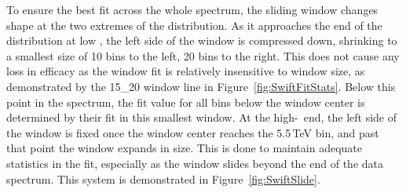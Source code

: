 To ensure the best fit across the whole spectrum, the sliding window changes shape at the two extremes of the distribution.  As it approaches the end of the distribution at low \mjj, the left side of the window is compressed down, shrinking to a smallest size of 10 bins to the left, 20 bins to the right.  This does not cause any loss in efficacy as the window fit is relatively insensitive to window size, as demonstrated by the 15\_20 window line in Figure~\ref{fig:SwiftFitStats}.  Below this point in the spectrum, the fit value for all bins below the window center is determined by their fit in this smallest window.  At the high-\mjj~end, the left side of the window is fixed once the window center reaches the 5.5\,TeV bin, and past that point the window expands in size.  This is done to maintain adequate statistics in the fit, especially as the window slides beyond the end of the data spectrum.  This system is demonstrated in Figure~\ref{fig:SwiftSlide}.

